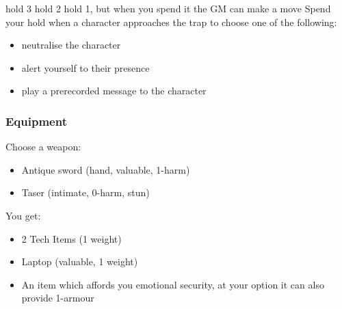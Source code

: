 {hold 3}
{hold 2}
{hold 1, but when you spend it the GM can make a move}
Spend your hold when a character approaches the trap to choose one of the following:
\begin{itemize}
\item neutralise the character
\item alert yourself to their presence
\item play a prerecorded message to the character
\end{itemize}


\subsubsection{Equipment}
Choose a weapon:
\begin{itemize}
\item Antique sword (hand, valuable, 1-harm)
\item Taser (intimate, 0-harm, stun)
\end{itemize}

You get:
\begin{itemize}
\item 2 Tech Items (1 weight)
\item Laptop (valuable, 1 weight)
\item An item which affords you emotional security, at your option it can also provide 1-armour
\end{itemize}